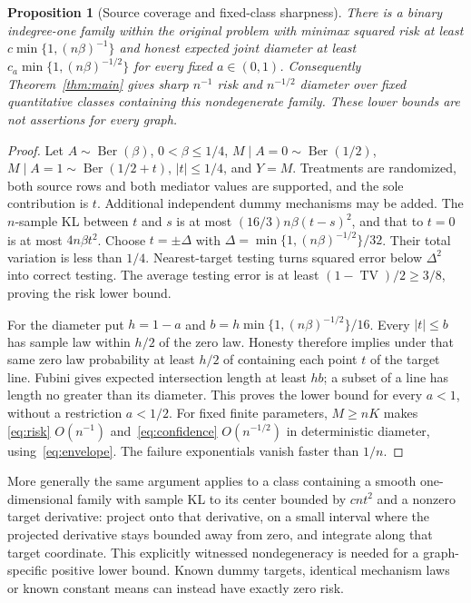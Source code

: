 \documentclass[11pt,a4paper]{article}
\numberwithin{equation}{section}
\newtheorem{proposition}[theorem]{Proposition}
\theoremstyle{definition}
\DeclareMathOperator{\TV}{TV}
\begin{document}
\begin{proposition}[Source coverage and fixed-class sharpness]\label{prop:scalar}
There is a binary indegree-one family within the original problem with
minimax squared risk at least $c\min\{1,(n\beta)^{-1}\}$ and honest
expected joint diameter at least
$c_a\min\{1,(n\beta)^{-1/2}\}$ for every fixed $a\in(0,1)$.
Consequently Theorem~\ref{thm:main} gives sharp $n^{-1}$ risk and
$n^{-1/2}$ diameter over fixed quantitative classes containing this
nondegenerate family. These lower bounds are not assertions for every graph.
\end{proposition}
\begin{proof}
Let $A\sim\operatorname{Ber}(\beta)$, $0<\beta\le1/4$,
$M\mid A=0\sim\operatorname{Ber}(1/2)$,
$M\mid A=1\sim\operatorname{Ber}(1/2+t)$, $|t|\le1/4$, and $Y=M$.
Treatments are randomized, both source rows and both mediator values are
supported, and the sole contribution is $t$. Additional independent dummy
mechanisms may be added. The $n$-sample KL between $t$ and $s$ is at most
$(16/3)n\beta(t-s)^2$, and that to $t=0$ is at most $4n\beta t^2$.
Choose $t=\pm\Delta$ with
$\Delta=\min\{1,(n\beta)^{-1/2}\}/32$. Their total variation is less
than $1/4$. Nearest-target testing turns squared error below $\Delta^2$
into correct testing. The average testing error is at least
$(1-\TV)/2\ge3/8$, proving the risk lower bound.

For the diameter put $h=1-a$ and
$b=h\min\{1,(n\beta)^{-1/2}\}/16$. Every $|t|\le b$ has sample law
within $h/2$ of the zero law. Honesty therefore implies under that same
zero law probability at least $h/2$ of containing each point $t$ of
the target line. Fubini gives expected intersection length at least
$hb$; a subset of a line has length no greater than its diameter.
This proves the lower bound for every $a<1$, without a restriction
$a<1/2$. For fixed finite parameters, $M\ge nK$ makes
\eqref{eq:risk} $O(n^{-1})$ and~\eqref{eq:confidence}
$O(n^{-1/2})$ in deterministic diameter, using~\eqref{eq:envelope}.
The failure exponentials vanish faster than $1/n$.
\end{proof}

More generally the same argument applies to a class containing a smooth
one-dimensional family with sample KL to its center bounded by $cn t^2$
and a nonzero target derivative: project onto that derivative, on a small
interval where the projected derivative stays bounded away from zero,
and integrate along that target coordinate. This explicitly witnessed
nondegeneracy is needed for a graph-specific positive lower bound.
Known dummy targets, identical mechanism laws or known constant means
can instead have exactly zero risk.
\end{document}
